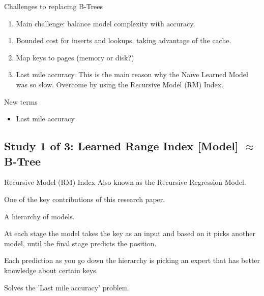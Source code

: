 \documentclass[presentation]{beamer}
\begin{document}
\begin{frame}[label={sec:org431afe2}]{Challenges to replacing B-Trees}
\begin{enumerate}
\item Main challenge: balance model \alert{complexity} with \alert{accuracy}.
\end{enumerate}

\begin{enumerate}
\item \alert{Bounded cost} for inserts and lookups, taking advantage of the \alert{cache}.
\item Map keys to pages (\alert{memory or disk?})
\item Last mile accuracy.
This is the main reason why the Naïve Learned Model was so slow.
Overcome by using the Recursive Model (RM) Index.
\end{enumerate}

\begin{block}{New terms}
\begin{itemize}
\item Last mile accuracy
\end{itemize}
\end{block}
\end{frame}
\subsection{Study 1 of 3: Learned Range Index [Model] \(\approx\) B-Tree}
\label{sec:org2ada132}
\begin{frame}[label={sec:org4216ef1}]{Recursive Model (RM) Index}
Also known as the Recursive Regression Model.

One of the key contributions of this research paper.

A hierarchy of models.

At each stage the model takes the key as an input and based on it picks another model, until the final stage predicts the position.

Each prediction as you go down the hierarchy is picking an expert that has better knowledge about certain keys.

Solves the 'Last mile accuracy' problem.
\end{frame}
\end{document}
